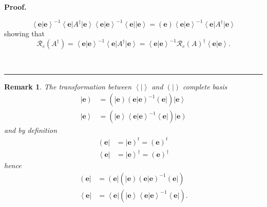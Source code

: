 \documentclass[aps,preprint]{revtex4}%
\newtheorem{remark}[theorem]{Remark}
\newenvironment{proof}[1][Proof]{\noindent\textbf{#1.} }{\ \rule{0.5em}{0.5em}}
\begin{document}
\begin{proof}
\begin{enumerate}
\begin{equation}
\left\langle \left.  \mathbf{e}\right\vert \mathbf{e}\right\rangle
^{-1}\left\langle \mathbf{e}\right\vert A^{\dagger}\left\vert \mathbf{e}%
\right\rangle \left\langle \left.  \mathbf{e}\right\vert \mathbf{e}%
\right\rangle ^{-1}\left\langle \mathbf{e}\right\vert \left\vert
\mathbf{e}\right\rangle =\left(  \mathbf{e}\right)  \left\langle \left.
\mathbf{e}\right\vert \mathbf{e}\right\rangle ^{-1}\left\langle \mathbf{e}%
\right\vert A^{\dagger}\left\vert \mathbf{e}\right\rangle
\end{equation}
showing that
\begin{equation}
\mathcal{R}_{e}\left(  A^{\dagger}\right)  =\left\langle \left.
\mathbf{e}\right\vert \mathbf{e}\right\rangle ^{-1}\left\langle \mathbf{e}%
\right\vert A^{\dagger}\left\vert \mathbf{e}\right\rangle =\left\langle
\left.  \mathbf{e}\right\vert \mathbf{e}\right\rangle ^{-1}\mathcal{R}%
_{e}\left(  A\right)  ^{\dagger}\left\langle \left.  \mathbf{e}\right\vert
\mathbf{e}\right\rangle .
\end{equation}

\end{enumerate}
\end{proof}

\begin{remark}
The transformation between $\left\langle \left.  {}\right\vert \right\rangle $
and $\left(  \left.  {}\right\vert \right)  $ complete basis
\begin{align}
\left\vert \mathbf{e}\right)   &  =\left(  \left\vert \mathbf{e}\right)
\left(  \left.  \mathbf{e}\right\vert \mathbf{e}\right)  ^{-1}\left(
\mathbf{e}\right\vert \right)  \left\vert \mathbf{e}\right\rangle \\
\left\vert \mathbf{e}\right\rangle  &  =\left(  \left\vert \mathbf{e}%
\right\rangle \left\langle \left.  \mathbf{e}\right\vert \mathbf{e}%
\right\rangle ^{-1}\left\langle \mathbf{e}\right\vert \right)  \left\vert
\mathbf{e}\right)
\end{align}
and by definition
\begin{align}
\left(  \mathbf{e}\right\vert  &  =\left\vert \mathbf{e}\right)  ^{t}=\left(
\mathbf{e}\right)  ^{t}\\
\left\langle \mathbf{e}\right\vert  &  =\left\vert \mathbf{e}\right\rangle
^{\dagger}=\left(  \mathbf{e}\right)  ^{\dagger}%
\end{align}
hence
\begin{align}
\left(  \mathbf{e}\right\vert  &  =\left(  \mathbf{e}\right\vert \left(
\left\vert \mathbf{e}\right)  \left(  \left.  \mathbf{e}\right\vert
\mathbf{e}\right)  ^{-1}\left(  \mathbf{e}\right\vert \right) \\
\left\langle \mathbf{e}\right\vert  &  =\left\langle \mathbf{e}\right\vert
\left(  \left\vert \mathbf{e}\right\rangle \left\langle \left.  \mathbf{e}%
\right\vert \mathbf{e}\right\rangle ^{-1}\left\langle \mathbf{e}\right\vert
\right)  .
\end{align}

\end{remark}
\end{document}
